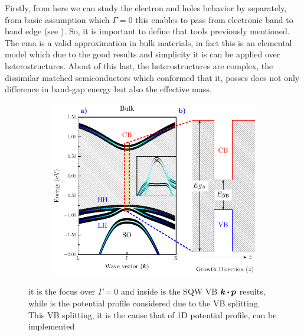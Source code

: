 Firstly, from here we can study the electron and holes behavior by separately, from basic assumption which $\Gamma=0$ this enables to pass from electronic band to band edge (see ). So, it is important to define that tools previously mentioned. The \gls{ema} is a valid approximation in bulk materials, in fact this is an elemental model which  due to the good results and simplicity it is can be applied over heterostructures.  About of this last, the heterostructures are complex, the dissimilar matched semiconductors which conformed that it, posses does not only difference in band-gap energy but also the effective mass.  

\begin{figure}[t!]
	\centering
	\begin{subfigure}{\textwidth}
	\includegraphics[width=\textwidth]{../figures/chapter-2/numerical-calculations/out/band-edge}
	\label{subfig:chapter-2-sec-numerical-calculations-band-edge-a}
	\label{subfig:chapter-2-sec-numerical-calculations-band-edge-b}
	\end{subfigure}
	\caption{ it is the focus over $\Gamma=0$ and inside is the SQW VB $\boldsymbol{k}\bigcdot \boldsymbol{p}$ results, while   is the potential profile considered due to the VB splitting. This VB splitting, it is the cause that of 1D potential profile, can be implemented}
	\label{fig:chapter-2-sec-numerical-calculations-band-edge}
\end{figure}

